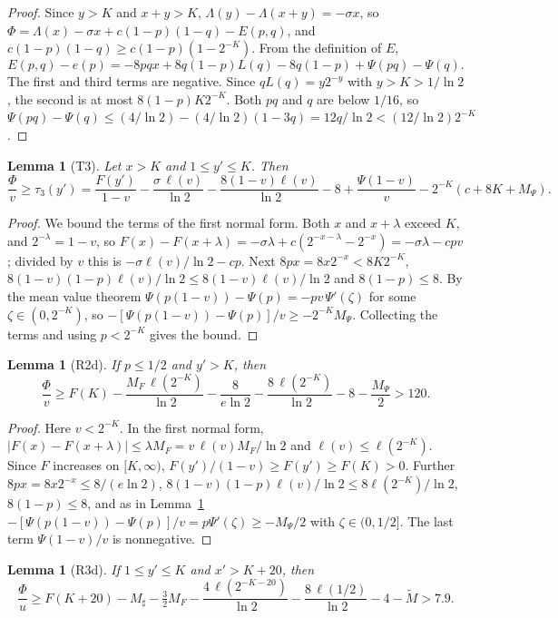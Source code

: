 \documentclass[11pt]{amsart}
\newtheorem{lemma}[theorem]{Lemma}
\theoremstyle{remark}
\begin{document}
\begin{proof}
Since $y>K$ and $x+y>K$, $\Lambda(y)-\Lambda(x+y)=-\sigma x$, so $\Phi=\Lambda(x)-\sigma x+c(1-p)(1-q)-E(p,q)$, and $c(1-p)(1-q)\ge c(1-p)(1-2^{-K})$. From the definition of $E$,
\[
E(p,q)-e(p)=-8pqx+8q(1-p)L(q)-8q(1-p)+\Psi(pq)-\Psi(q).
\]
The first and third terms are negative. Since $qL(q)=y2^{-y}$ with $y>K>1/\ln2$, the second is at most $8(1-p)K2^{-K}$. Both $pq$ and $q$ are below $1/16$, so $\Psi(pq)-\Psi(q)\le(4/\ln2)-(4/\ln2)(1-3q)=12q/\ln2<(12/\ln2)2^{-K}$.
\end{proof}

\begin{lemma}[T3]\label{lem:T3}
Let $x>K$ and $1\le y'\le K$. Then
\[
\frac{\Phi}{v}\ge\tau_3(y')=\frac{F(y')}{1-v}-\frac{\sigma\,\ell(v)}{\ln2}-\frac{8(1-v)\ell(v)}{\ln2}-8+\frac{\Psi(1-v)}{v}-2^{-K}(c+8K+M_\Psi).
\]
\end{lemma}

\begin{proof}
We bound the terms of the first normal form. Both $x$ and $x+\lambda$ exceed $K$, and $2^{-\lambda}=1-v$, so $F(x)-F(x+\lambda)=-\sigma\lambda+c(2^{-x-\lambda}-2^{-x})=-\sigma\lambda-cpv$; divided by $v$ this is $-\sigma\ell(v)/\ln2-cp$. Next $8px=8x2^{-x}<8K2^{-K}$, $8(1-v)(1-p)\ell(v)/\ln2\le8(1-v)\ell(v)/\ln2$ and $8(1-p)\le8$. By the mean value theorem $\Psi(p(1-v))-\Psi(p)=-pv\,\Psi'(\zeta)$ for some $\zeta\in(0,2^{-K})$, so $-[\Psi(p(1-v))-\Psi(p)]/v\ge-2^{-K}M_\Psi$. Collecting the terms and using $p<2^{-K}$ gives the bound.
\end{proof}

\begin{lemma}[R2d]\label{lem:R2d}
If $p\le1/2$ and $y'>K$, then
\[
\frac{\Phi}{v}\ge F(K)-\frac{M_F\,\ell(2^{-K})}{\ln2}-\frac{8}{e\ln2}-\frac{8\,\ell(2^{-K})}{\ln2}-8-\frac{M_\Psi}{2}>120.
\]
\end{lemma}

\begin{proof}
Here $v<2^{-K}$. In the first normal form, $|F(x)-F(x+\lambda)|\le\lambda M_F=v\,\ell(v)M_F/\ln2$ and $\ell(v)\le\ell(2^{-K})$. Since $F$ increases on $[K,\infty)$, $F(y')/(1-v)\ge F(y')\ge F(K)>0$. Further $8px=8x2^{-x}\le8/(e\ln2)$, $8(1-v)(1-p)\ell(v)/\ln2\le8\ell(2^{-K})/\ln2$, $8(1-p)\le8$, and as in Lemma~\ref{lem:T3} $-[\Psi(p(1-v))-\Psi(p)]/v=p\Psi'(\zeta)\ge-M_\Psi/2$ with $\zeta\in(0,1/2]$. The last term $\Psi(1-v)/v$ is nonnegative.
\end{proof}

\begin{lemma}[R3d]\label{lem:R3d}
If $1\le y'\le K$ and $x'>K+20$, then
\[
\frac{\Phi}{u}\ge F(K+20)-M_\sharp-\tfrac32M_F-\frac{4\,\ell(2^{-K-20})}{\ln2}-\frac{8\,\ell(1/2)}{\ln2}-4-\widetilde M>7.9.
\]
\end{lemma}
\end{document}
